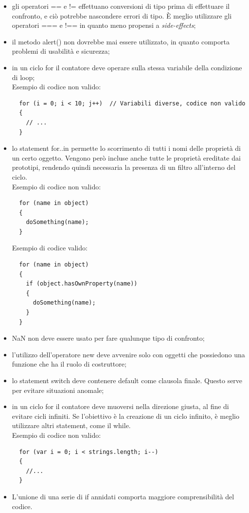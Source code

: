 \begin{itemize}
	\item gli operatori == e != effettuano conversioni di tipo prima di effettuare il confronto, e ciò potrebbe nascondere errori di tipo. È meglio utilizzare gli operatori === e !== in quanto meno propensi a \textit{side-effects};
	\item il metodo alert() non dovrebbe mai essere utilizzato, in quanto comporta problemi di usabilità e sicurezza;
	\item in un ciclo for il contatore deve operare sulla stessa variabile della condizione di loop;\\
Esempio di codice non valido:
\begin{verbatim}
  for (i = 0; i < 10; j++)  // Variabili diverse, codice non valido
  {
    // ...
  }
\end{verbatim}
	\item lo statement for..in permette lo scorrimento di tutti i nomi delle proprietà di un certo oggetto. Vengono però incluse anche tutte le proprietà ereditate dai prototipi, rendendo quindi necessaria la presenza di un filtro all'interno del ciclo.\\
Esempio di codice non valido:
\begin{verbatim}
  for (name in object)
  {
    doSomething(name);
  }
\end{verbatim}
Esempio di codice valido:
\begin{verbatim}
  for (name in object)
  {
    if (object.hasOwnProperty(name))
    {
      doSomething(name);
    }
  }
\end{verbatim}
	\item NaN non deve essere usato per fare qualunque tipo di confronto;
	\item l'utilizzo dell'operatore new deve avvenire solo con oggetti che possiedono una funzione che ha il ruolo di costruttore;
	\item lo statement switch deve contenere default come clausola finale. Questo serve per evitare situazioni anomale;
	\item in un ciclo for il contatore deve muoversi nella direzione giusta, al fine di evitare cicli infiniti. Se l'obiettivo è la creazione di un ciclo infinito, è meglio utilizzare altri statement, come il while.\\
Esempio di codice non valido:
\begin{verbatim}
  for (var i = 0; i < strings.length; i--)
  {
    //...
  }
\end{verbatim}
	\item L'unione di una serie di if annidati comporta maggiore comprensibilità del codice.\\

\end{itemize}
